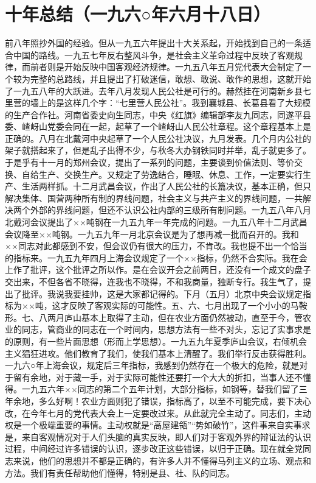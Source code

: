 \section[十年总结（一九六○年六月十八日）]{十年总结（一九六○年六月十八日）}


前八年照抄外国的经验。但从一九五六年提出十大关系起，开始找到自己的一条适合中国的路线。一九五七年反右整风斗争，是社会主义革命过程中反映了客观规律，而前者则是开始反映中国客观经济规律。一九五八年五月党代表大会制定了一个较为完整的总路线，并且提出了打破迷信，敢想、敢说、敢作的思想，这就开始了一九五八年的大跃进。去年八月发现人民公社是可行的。赫然挂在河南新乡县七里营的墙上的是这样几个字：“七里营人民公社”。我到襄城县、长葛县看了大规模的生产合作社。河南省委史向生同志，中央《红旗》编辑部李友九同志，同遂平县委、嵖岈山党委会同在一起，起草了一个嵖岈山人民公社章程。这个章程基本上是正确的。八月在北戴河中央起草了一个人民公社决议，九月发表。几个月内公社的架子就搭起来了，但是乱子出得不少，与秋冬大办钢铁同时并举，乱子就更多了。于是乎有十一月的郑州会议，提出了一系列的问题，主要谈到价值法则、等价交换、自给生产、交换生产。又规定了劳逸结合，睡眠、休息、工作，一定要实行生产、生活两样抓。十二月武昌会议，作出了人民公社的长篇决议，基本正确，但只解决集体、国营两种所有制的界线问题，社会主义与共产主义的界线问题，一共解决两个外部的界线问题，但还不认识公社内部的三级所有制问题。一九五八年八月北戴河会议提出了××吨钢在一九五九年一年完成的问题。一九五八年十二月武昌会议降至××吨钢。一九五九年一月北京会议是为了想再减一批而召开的。我和××同志对此都感到不安，但会议仍有很大的压力，不肯改。我也提不出一个恰当的指标来。一九五九年四月上海会议规定了一个××指标，仍然不合实际。我在会上作了批评，这个批评之所以作。是在会议开会之前两日，还没有一个成文的盘子交出来，不但各省不晓得，连我也不晓得，不和我商量，独断专行。我生气了，提出了批评。我说我要挂帅，这是大家都记得的。下月（五月）北京中央会议规定指标为××吨，这才反映了客观实际的可能性。五、六、七月出现了一个小小的马鞍形。七、八两月庐山基本上取得了主动，但在农业方面仍然被动，直至于今，管农业的同志，管商业的同志在一个时间内，思想方法有一些不对头，忘记了实事求是的原则，有一些片面思想（形而上学思想）。一九五九年夏季庐山会议，右倾机会主义猖狂进攻。他们教育了我们，使我们基本上清醒了。我们举行反击获得胜利。一九六○年上海会议，规定后三年指标，我感到仍然存在一个极大的危险，就是对于留有余地，对于藏一手，对于实际可能性还要打一个大大的折扣，当事人还不懂得。一九五六年××同志的第二个五年计划，大部分指标，如钢等，替我们留了三年余地，多么好啊！农业方面则犯了错误，指标高了，以至不可能完成，要下决心改，在今年七月的党代表大会上一定要改过来。从此就完全主动了。同志们，主动权是一个极端重要的事情。主动权就是“高屋建瓴”“势如破竹”，这件事来自实事求是，来自客观情况对于人们头脑的真实反映，即人们对于客观外界的辩证法的认识过程，中间经过许多错误的认识，逐步改正这些错误，以归于正确。现在就全党同志来说，他们的思想并不都是正确的，有许多人并不懂得马列主义的立场、观点和方法。我们有责任帮助他们懂得，特别是县、社、队的同志。

